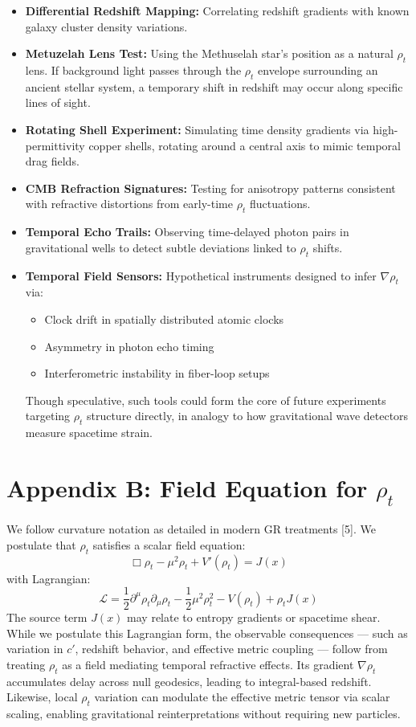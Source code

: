\documentclass[12pt]{article}
\begin{document}
\begin{itemize}
  \item \textbf{Differential Redshift Mapping:} Correlating redshift gradients with known galaxy cluster density variations.
  \item \textbf{Metuzelah Lens Test:} Using the Methuselah star’s position as a natural $\rho_t$ lens. If background light passes through the $\rho_t$ envelope surrounding an ancient stellar system, a temporary shift in redshift may occur along specific lines of sight.
  \item \textbf{Rotating Shell Experiment:} Simulating time density gradients via high-permittivity copper shells, rotating around a central axis to mimic temporal drag fields. 
  \item \textbf{CMB Refraction Signatures:} Testing for anisotropy patterns consistent with refractive distortions from early-time $\rho_t$ fluctuations.
  \item \textbf{Temporal Echo Trails:} Observing time-delayed photon pairs in gravitational wells to detect subtle deviations linked to $\rho_t$ shifts.
  \item \textbf{Temporal Field Sensors:} Hypothetical instruments designed to infer $\nabla \rho_t$ via:
    \begin{itemize}
      \item Clock drift in spatially distributed atomic clocks
      \item Asymmetry in photon echo timing
      \item Interferometric instability in fiber-loop setups
    \end{itemize}
    Though speculative, such tools could form the core of future experiments targeting $\rho_t$ structure directly, in analogy to how gravitational wave detectors measure spacetime strain.
\end{itemize}

\section{Appendix B: Field Equation for $\rho_t$}
We follow curvature notation as detailed in modern GR treatments [5].
We postulate that $\rho_t$ satisfies a scalar field equation:
\[ \Box \rho_t - \mu^2 \rho_t + V'(\rho_t) = J(x) \]
with Lagrangian:
\[ \mathcal{L} = \frac{1}{2} \partial^\mu \rho_t \partial_\mu \rho_t - \frac{1}{2} \mu^2 \rho_t^2 - V(\rho_t) + \rho_t J(x) \]
The source term $J(x)$ may relate to entropy gradients or spacetime shear. While we postulate this Lagrangian form, the observable consequences — such as variation in $c'$, redshift behavior, and effective metric coupling — follow from treating $\rho_t$ as a field mediating temporal refractive effects. Its gradient $\nabla \rho_t$ accumulates delay across null geodesics, leading to integral-based redshift. Likewise, local $\rho_t$ variation can modulate the effective metric tensor via scalar scaling, enabling gravitational reinterpretations without requiring new particles.
\end{document}
